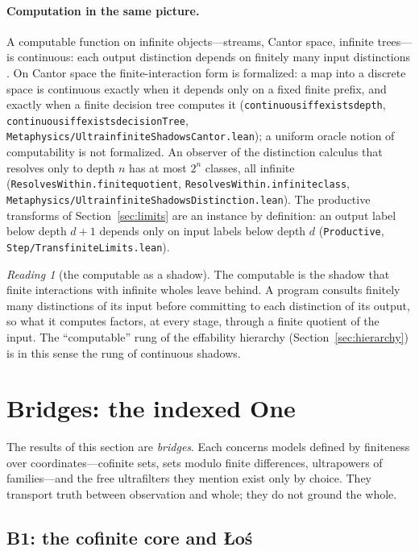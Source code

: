 \documentclass[]{article}
\theoremstyle{definition}
\theoremstyle{remark}
\newtheorem{reading}[theorem]{Reading}
\newcommand{\codeus}{\textunderscore\allowbreak}
\newcommand{\code}[1]{\texttt{\let\_\codeus #1}}
\newcommand{\lpath}[1]{{\ttfamily\nolinkurl{#1}}}
\newcommand{\meta}[1]{\lpath{Metaphysics/#1.lean}}
\newcommand{\step}[1]{\lpath{Step/#1.lean}}
\begin{document}
\paragraph{Computation in the same picture.} A computable function on infinite objects---streams,
Cantor space, infinite trees---is continuous: each output distinction depends on finitely many input
distinctions \cite{Weihrauch2000}. On Cantor space the finite-interaction form is formalized: a map
into a discrete space is continuous exactly when it depends only on a fixed finite prefix, and
exactly when a finite decision tree computes it (\code{continuous\_iff\_exists\_depth},
\code{continuous\_iff\_exists\_decisionTree}, \meta{UltrainfiniteShadowsCantor}); a uniform
oracle notion of computability is not formalized. An observer of the distinction calculus that
resolves only to depth $n$ has at most $2^n$ classes, all infinite (\code{ResolvesWithin.finite\_quotient},
\code{ResolvesWithin.infinite\_class}, \meta{UltrainfiniteShadowsDistinction}). The productive
transforms of Section~\ref{sec:limits} are an
instance by definition: an output label below depth $d+1$ depends only on input labels below depth
$d$ (\code{Productive}, \step{TransfiniteLimits}).

\begin{reading}[the computable as a shadow]
\label{read:shadow}
The computable is the shadow that finite interactions with infinite wholes leave behind. A program
consults finitely many distinctions of its input before committing to each distinction of its
output, so what it computes factors, at every stage, through a finite quotient of the input. The
``computable'' rung of the effability hierarchy (Section~\ref{sec:hierarchy}) is in this sense the
rung of continuous shadows.
\end{reading}

\section{Bridges: the indexed One}
\label{sec:bridges}

The results of this section are \emph{bridges}. Each concerns models defined by finiteness over
coordinates---cofinite sets, sets modulo finite differences, ultrapowers of families---and the free
ultrafilters they mention exist only by choice. They transport truth between observation and
whole; they do not ground the whole.

\subsection{B1: the cofinite core and {\L}o\'s}
\label{sec:cofinite}
\end{document}
